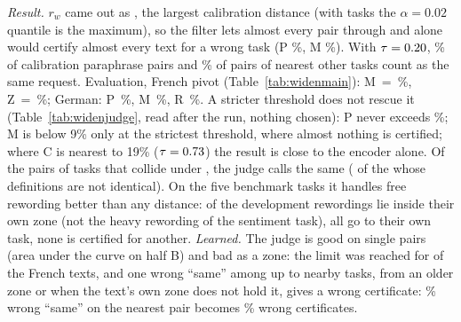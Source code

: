 \emph{Result.} $r_w$ came out as \WidenJudgeRw{}, the largest calibration distance (with \WidenHalfB{} tasks the $\alpha = 0.02$ quantile is the maximum), so the filter lets almost every pair through and alone would certify almost every text for a wrong task (\textsf{P} \WidenJudgeFilterOnlyP{}\%, \textsf{M} \WidenJudgeFilterOnlyM{}\%). With $\tau = \WidenJudgeTau{}$, \WidenJudgePosSame{}\% of calibration paraphrase pairs and \WidenJudgeNegSame{}\% of pairs of nearest other tasks count as the same request. Evaluation, French pivot (Table~\ref{tab:widenmain}): \textsf{M}~=~\WidenJudgeFrM{}\%, \textsf{Z}~=~\WidenJudgeFrZ{}\%; German: \textsf{P}~\WidenJudgeDeP{}\%, \textsf{M}~\WidenJudgeDeM{}\%, \textsf{R}~\WidenJudgeDeR{}\%. A stricter threshold does not rescue it (Table~\ref{tab:widenjudge}, read after the run, nothing chosen): \textsf{P} never exceeds \WidenSweepPMax{}\%; \textsf{M} is below 9\% only at the strictest threshold, where almost nothing is certified; where \textsf{C} is nearest to 19\% ($\tau = 0.73{}$) the result is close to the encoder alone. Of the \WidenJudgeCollisionPairs{} pairs of tasks that collide under \cert{}, the judge calls \WidenJudgeCollisionSame{} the same (\WidenJudgeCollisionNotSameSame{} of the \WidenJudgeCollisionNotSame{} whose definitions are not identical). On the five benchmark tasks it handles free rewording better than any distance: \WidenJudgeBenchInside{} of the \WidenJudgeBenchTotal{} development rewordings lie inside their own zone (not the heavy rewording of the sentiment task), all go to their own task, none is certified for another.
\emph{Learned.} The judge is good on single pairs (area under the curve \WidenJudgeAucNli{} on half B) and bad as a zone: the limit was reached for \WidenJudgeLimitFr{} of the \WidenTasksEval{} French texts, and one wrong ``same'' among up to \WidenJudgeLimit{} nearby tasks, from an older zone or when the text's own zone does not hold it, gives a wrong certificate: \WidenJudgeNegSame{}\% wrong ``same'' on the nearest pair becomes \WidenJudgeFrM{}\% wrong certificates.

\begin{table}[t]
  \caption{The judge zone over twelve thresholds $\tau$ (French pivot, \WidenTasksEval{} evaluation tasks, in \%), looked at after the run; nothing was chosen from it. The primary $\tau = \WidenJudgeTau{}$ was fixed on half B before the run (the row 0.19 is a grid point).}
  \label{tab:widenjudge}
  \centering
  \small
  
\end{table}

